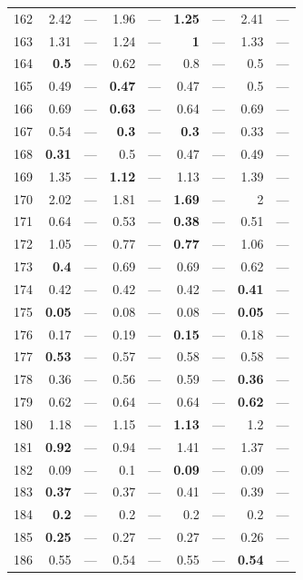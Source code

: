 \begin{longtable}{lr@{\hskip 4pt}l@{\hskip 12pt}r@{\hskip 4pt}l@{\hskip 12pt}r@{\hskip 4pt}l@{\hskip 12pt}r@{\hskip 4pt}l@{\hskip 12pt}}
162 & 2.42 & --- & 1.96 & --- & \textbf{1.25} & --- & 2.41 & --- \\
163 & 1.31 & --- & 1.24 & --- & \textbf{1} & --- & 1.33 & --- \\
164 & \textbf{0.5} & --- & 0.62 & --- & 0.8 & --- & 0.5 & --- \\
165 & 0.49 & --- & \textbf{0.47} & --- & 0.47 & --- & 0.5 & --- \\
166 & 0.69 & --- & \textbf{0.63} & --- & 0.64 & --- & 0.69 & --- \\
167 & 0.54 & --- & \textbf{0.3} & --- & \textbf{0.3} & --- & 0.33 & --- \\
168 & \textbf{0.31} & --- & 0.5 & --- & 0.47 & --- & 0.49 & --- \\
169 & 1.35 & --- & \textbf{1.12} & --- & 1.13 & --- & 1.39 & --- \\
170 & 2.02 & --- & 1.81 & --- & \textbf{1.69} & --- & 2 & --- \\
171 & 0.64 & --- & 0.53 & --- & \textbf{0.38} & --- & 0.51 & --- \\
172 & 1.05 & --- & 0.77 & --- & \textbf{0.77} & --- & 1.06 & --- \\
173 & \textbf{0.4} & --- & 0.69 & --- & 0.69 & --- & 0.62 & --- \\
174 & 0.42 & --- & 0.42 & --- & 0.42 & --- & \textbf{0.41} & --- \\
175 & \textbf{0.05} & --- & 0.08 & --- & 0.08 & --- & \textbf{0.05} & --- \\
176 & 0.17 & --- & 0.19 & --- & \textbf{0.15} & --- & 0.18 & --- \\
177 & \textbf{0.53} & --- & 0.57 & --- & 0.58 & --- & 0.58 & --- \\
178 & 0.36 & --- & 0.56 & --- & 0.59 & --- & \textbf{0.36} & --- \\
179 & 0.62 & --- & 0.64 & --- & 0.64 & --- & \textbf{0.62} & --- \\
180 & 1.18 & --- & 1.15 & --- & \textbf{1.13} & --- & 1.2 & --- \\
181 & \textbf{0.92} & --- & 0.94 & --- & 1.41 & --- & 1.37 & --- \\
182 & 0.09 & --- & 0.1 & --- & \textbf{0.09} & --- & 0.09 & --- \\
183 & \textbf{0.37} & --- & 0.37 & --- & 0.41 & --- & 0.39 & --- \\
184 & \textbf{0.2} & --- & 0.2 & --- & 0.2 & --- & 0.2 & --- \\
185 & \textbf{0.25} & --- & 0.27 & --- & 0.27 & --- & 0.26 & --- \\
186 & 0.55 & --- & 0.54 & --- & 0.55 & --- & \textbf{0.54} & --- \\

\end{longtable}
